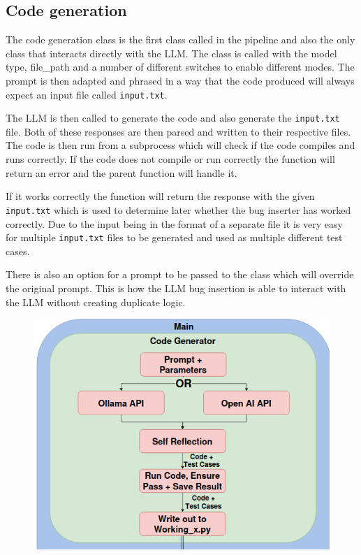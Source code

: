 \documentclass[12pt]{extarticle}
\begin{document}
\subsection{Code generation}

The code generation class is the first class called in the pipeline and also the only class that interacts directly with the LLM. The class is called with the model type, file\_path and a number of different switches to enable different modes. The prompt is then adapted and phrased in a way that the code produced will always expect an input file called \texttt{input.txt}. 

The LLM is then called to generate the code and also generate the \texttt{input.txt} file. Both of these responses are then parsed and written to their respective files. The code is then run from a subprocess which will check if the code compiles and runs correctly. If the code does not compile or run correctly the function will return an error and the parent function will handle it. 

If it works correctly the function will return the response with the given \texttt{input.txt} which is used to determine later whether the bug inserter has worked correctly. Due to the input being in the format of a separate file it is very easy for multiple \texttt{input.txt} files to be generated and used as multiple different test cases. 

There is also an option for a prompt to be passed to the class which will override the original prompt. This is how the LLM bug insertion is able to interact with the LLM without creating duplicate logic. 

\begin{figure}[htbp]
\centering
\includegraphics[width=0.7\linewidth]{Images/Code_Generator.png}
\label{fig:code_generator}
\end{figure}
\end{document}
